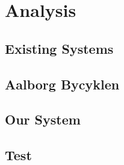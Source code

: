 


\setcounter{secnumdepth}{3}

\setcounter{page}{1}

\setcounter{tocdepth}{1}
\tableofcontents

\cleardoublepage


\chapter{Analysis}



\section{Existing Systems}


\section{Aalborg Bycyklen}


\section{Our System}


\section{Test}




